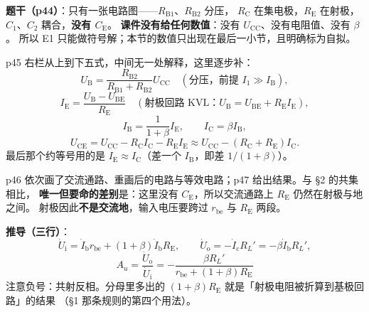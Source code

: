 \documentclass[11pt]{ctexart}
\begin{document}

\textbf{题干（p44）}：只有一张电路图——$R_{\mathrm{B1}}$、$R_{\mathrm{B2}}$ 分压，
$R_{\mathrm{C}}$ 在集电极，$R_{\mathrm{E}}$ 在射极，$C_1$、$C_2$ 耦合，\textbf{没有 $C_{\mathrm{E}}$}。
\textbf{课件没有给任何数值}：没有 $U_{\mathrm{CC}}$、没有电阻值、没有 $\beta$。
所以 E1 只能做符号解；本节的数值只出现在最后一小节，且明确标为自拟。


p45 右栏从上到下五式，中间无一处解释，这里逐步补：
\[
U_{\mathrm{B}}=\frac{R_{\mathrm{B2}}}{R_{\mathrm{B1}}+R_{\mathrm{B2}}}U_{\mathrm{CC}}
\quad(\text{分压，前提 }I_1\gg I_{\mathrm{B}}),
\]
\[
I_{\mathrm{E}}=\frac{U_{\mathrm{B}}-U_{\mathrm{BE}}}{R_{\mathrm{E}}}
\quad(\text{射极回路 KVL：}U_{\mathrm{B}}=U_{\mathrm{BE}}+R_{\mathrm{E}}I_{\mathrm{E}}),
\]
\[
I_{\mathrm{B}}=\frac{1}{1+\beta}I_{\mathrm{E}},\qquad I_{\mathrm{C}}=\beta I_{\mathrm{B}},
\]
\[
U_{\mathrm{CE}}=U_{\mathrm{CC}}-R_{\mathrm{C}}I_{\mathrm{C}}-R_{\mathrm{E}}I_{\mathrm{E}}
\approx U_{\mathrm{CC}}-(R_{\mathrm{C}}+R_{\mathrm{E}})I_{\mathrm{C}} .
\]
最后那个约等号用的是 $I_{\mathrm{E}}\approx I_{\mathrm{C}}$（差一个 $I_{\mathrm{B}}$，即差 $1/(1+\beta)$）。



p46 依次画了交流通路、重画后的电路与等效电路；p47 给出结果。与 §2 的共集相比，
\textbf{唯一但要命的差别}是：这里没有 $C_{\mathrm{E}}$，所以交流通路上 $R_{\mathrm{E}}$ 仍然在射极与地之间。
射极因此\textbf{不是交流地}，输入电压要跨过 $r_{\mathrm{be}}$ 与 $R_{\mathrm{E}}$ 两段。

\textbf{推导（三行）}：
\[
\dot U_{\mathrm{i}}=\dot I_{\mathrm{b}}r_{\mathrm{be}}+(1+\beta)\dot I_{\mathrm{b}}R_{\mathrm{E}},
\qquad
\dot U_{\mathrm{o}}=-\dot I_{\mathrm{c}}R_L'=-\beta\dot I_{\mathrm{b}}R_L',
\]
\[
\boxed{\;A_u=\frac{\dot U_{\mathrm{o}}}{\dot U_{\mathrm{i}}}
=-\frac{\beta R_L'}{r_{\mathrm{be}}+(1+\beta)R_{\mathrm{E}}}\;}
\]
注意负号：共射反相。分母里多出的 $(1+\beta)R_{\mathrm{E}}$ 就是「射极电阻被折算到基极回路」的结果
（§1 那条规则的第四个用法）。
\end{document}

